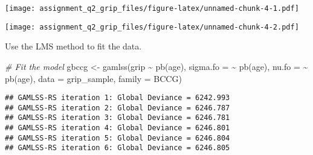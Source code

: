 \documentclass[
]{article}
\newenvironment{Shaded}{\begin{snugshade}}{\end{snugshade}}
\newcommand{\AttributeTok}[1]{\textcolor[rgb]{0.77,0.63,0.00}{#1}}
\newcommand{\CommentTok}[1]{\textcolor[rgb]{0.56,0.35,0.01}{\textit{#1}}}
\newcommand{\DecValTok}[1]{\textcolor[rgb]{0.00,0.00,0.81}{#1}}
\newcommand{\FunctionTok}[1]{\textcolor[rgb]{0.00,0.00,0.00}{#1}}
\newcommand{\NormalTok}[1]{#1}
\newcommand{\OtherTok}[1]{\textcolor[rgb]{0.56,0.35,0.01}{#1}}
\newcommand{\SpecialCharTok}[1]{\textcolor[rgb]{0.00,0.00,0.00}{#1}}
\newcommand{\StringTok}[1]{\textcolor[rgb]{0.31,0.60,0.02}{#1}}
\begin{document}
\texttt{[image: assignment\_q2\_grip\_files/figure-latex/unnamed-chunk-4-1.pdf]}

\begin{Shaded}
\end{Shaded}

\texttt{[image: assignment\_q2\_grip\_files/figure-latex/unnamed-chunk-4-2.pdf]}

Use the LMS method to fit the data.

\begin{Shaded}
\begin{Highlighting}[]
\CommentTok{\# Fit the model}
\NormalTok{gbccg }\OtherTok{\textless{}{-}} \FunctionTok{gamlss}\NormalTok{(grip }\SpecialCharTok{\textasciitilde{}} \FunctionTok{pb}\NormalTok{(age),}
                \AttributeTok{sigma.fo =} \SpecialCharTok{\textasciitilde{}} \FunctionTok{pb}\NormalTok{(age),}
                \AttributeTok{nu.fo =} \SpecialCharTok{\textasciitilde{}} \FunctionTok{pb}\NormalTok{(age),}
                \AttributeTok{data =}\NormalTok{ grip\_sample,}
                \AttributeTok{family =}\NormalTok{ BCCG)}
\end{Highlighting}
\end{Shaded}

\begin{verbatim}
## GAMLSS-RS iteration 1: Global Deviance = 6242.993 
## GAMLSS-RS iteration 2: Global Deviance = 6246.787 
## GAMLSS-RS iteration 3: Global Deviance = 6246.781 
## GAMLSS-RS iteration 4: Global Deviance = 6246.801 
## GAMLSS-RS iteration 5: Global Deviance = 6246.804 
## GAMLSS-RS iteration 6: Global Deviance = 6246.805
\end{verbatim}
\end{document}
